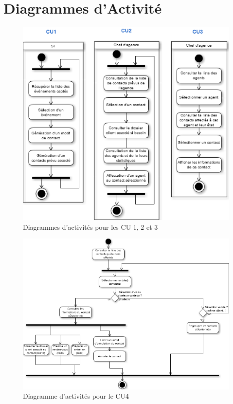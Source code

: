 \section{Diagrammes d'Activité}

\begin{figure}[H]
	\begin{center}
		\includegraphics[scale=0.4]{Includes/SOA-Activite-CU1-2-3.png}
		\caption{Diagrammes d'activités pour les CU 1, 2 et 3}
	\end{center}
\end{figure}

\begin{figure}[H]
	\begin{center}
		\includegraphics[scale=0.4]{Includes/SOA-Activite-CU4.png}
		\caption{Diagramme d'activités pour le CU4}
	\end{center}
\end{figure}

